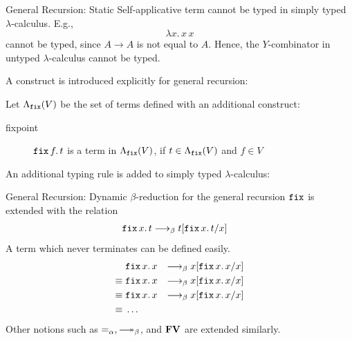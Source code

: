 \begin{frame}{General Recursion: Static}
  Self-applicative term cannot be typed in simply typed $\lambda$-calculus.
  E.g., 
  \[
    \lambda x.\, x\,x
  \]
  cannot be typed, since $A \to A$ is not equal to $A$.
  Hence, the $Y$-combinator in untyped $\lambda$-calculus cannot be typed.

  A construct is introduced explicitly for general recursion:

  Let $\Lambda_{\fix}(V)$ be the set of terms defined with an additional construct:
  \begin{description}
    \item[fixpoint] $\fix\,f.\, t$ is a term in $\Lambda_{\fix}(V)$, if $t \in \Lambda_{\fix}(V)$ and $f \in V$
  \end{description}

  An additional typing rule is added to simply typed $\lambda$-calculus:
  \begin{prooftree}
  \end{prooftree}
\end{frame}

\begin{frame}{General Recursion: Dynamic}
  $\beta$-reduction for the general recursion $\fix$ is extended with the relation
  \begin{align*}
    \fix\,x.\,t & \onereduce t\subst{\fix\,x.\,t}{x}
  \end{align*}
  \vfill
  A term which never terminates can be defined easily.
  \begin{align*}
             & \fix\,x.\,x & \onereduce x\subst{\fix\,x.\,x}{x} \\
    \equiv{} & \fix\,x.\,x & \onereduce x\subst{\fix\,x.\,x}{x} \\
    \equiv{} & \fix\,x.\,x & \onereduce x\subst{\fix\,x.\,x}{x} \\
    \equiv{} & \dots
  \end{align*}
  \vfill
  Other notions such as $=_\alpha, \reduce$, and $\FV$ are extended similarly.
\end{frame}


